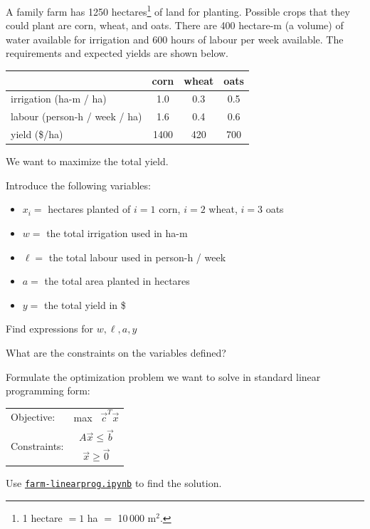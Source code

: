 \documentclass{workbook}
\begin{document}
\begin{slide}
\question

\begin{problem}
	A family farm has 1250 hectares\footnote{1 hectare $=1$ ha $=$ 10\,000 m$^2$.}  of land for planting. Possible crops that they could plant are corn, wheat, and oats. There are 400 hectare-m (a volume) of water available for irrigation and 600 hours of labour per week available. The requirements and expected yields are shown below.
	
	
	\begin{center}
	\small
	\begin{tabular}{l|c|c|c}
	& corn & wheat & oats \\ \hline
	irrigation (ha-m / ha) & 1.0 & 0.3 & 0.5 \\ \hline
	labour (person-h / week / ha) & 1.6 & 0.4 & 0.6 \\ \hline
	yield (\$/ha) & 1400 & 420 & 700 \\ %
	\end{tabular}
	\end{center}
	
	We want to maximize the total yield.
\end{problem}

Introduce the following variables:
\begin{itemize}
	\item $x_i= $ hectares planted of $i=1$ corn, $i=2$ wheat, $i=3$ oats
	\item $w=$ the total irrigation used in ha-m
	\item $\ell=$ the total labour used in person-h / week
	\item $a=$ the total area planted in hectares
	\item $y=$ the total yield in \$
\end{itemize}

\begin{parts}
	\item Find expressions for $w, \ell, a, y$
	\item What are the constraints on the variables defined?	
	\item Formulate the optimization problem we want to solve in standard linear programming form:
	\begin{center}
		\begin{tabular}{lc}
		Objective: 		& max \ $\vec{c}^T \vec{x}$ \\
		\multirow{2}{*}{Constraints:} 	& $A \vec{x} \leq \vec{b}$ \\
						& $\vec{x} \geq \vec{0}$
		\end{tabular}
	\end{center}
	\item Use \href{https://utoronto.syzygy.ca/jupyter/user-redirect/git-pull?repo=https://github.com/bigfatbernie/IBLMathModeling&subPath=python/farm-linearprog.ipynb}{\tt farm-linearprog.ipynb} to find the solution.

\end{parts}

\end{slide}
\end{document}
